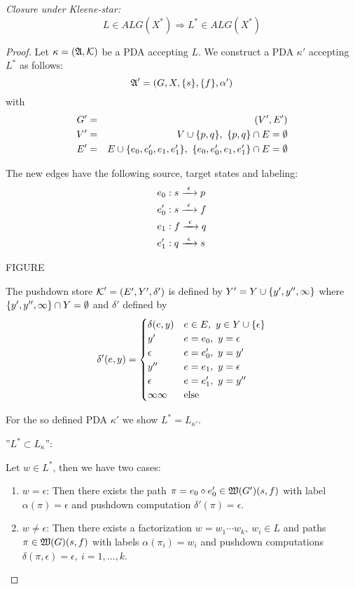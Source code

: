 {\em Closure under Kleene-star:}
\[ L \in ALG(X^*) \Rightarrow L^* \in ALG(X^*) \]
\begin{proof}
Let $\kappa = (\mbox{$\mathfrak{A}$}, \mbox{$\mathcal{K}$})$ be a PDA accepting $L$. We construct a PDA
$\kappa'$ accepting $L^*$ as follows:
\[ \mbox{$\mathfrak{A}$}' = (G, X, \mbox{$\{s\}$}, \mbox{$\{f\}$}, \alpha')\]
with
\begin{eqnarray*}
G' &=& (V', E') \\
V' &=& V \cup \mbox{$\{p, q\}$},\ \mbox{$\{p, q\}$} \cap E = \emptyset \\
E' &=& E \cup \mbox{$\{e_0, e_0', e_1, e_1'\}$},\ \mbox{$\{e_0, e_0', e_1, e_1'\}$} \cap E
= \emptyset \\
\end{eqnarray*}

The new edges have the following source, target states and labeling:
\begin{eqnarray*}
& e_0: s \xrightarrow{\ {\epsilon}\ } p \\
& e_0': s \xrightarrow{\ {\epsilon}\ } f \\
& e_1: f \xrightarrow{\ {\epsilon}\ } q \\
& e_1': q \xrightarrow{\ {\epsilon}\ } s \\
\end{eqnarray*}

FIGURE

The pushdown store $\mbox{$\mathcal{K}$}' = (E', Y', \delta')$ is defined by $Y' = Y
\cup \mbox{$\{y', y'', \infty\}$}$ where $\mbox{$\{y', y'', \infty\}$} \cap Y =
\emptyset$ and $\delta'$ defined by
\[ \delta'(e, y) = \begin{cases}
\delta(e, y)		& e \in E,\ y \in  Y \cup \mbox{$\{\epsilon\}$} \\
y'							& e = e_0,\ y = \epsilon \\
\epsilon				& e = e_0',\ y = y' \\
y''							& e = e_1,\ y = \epsilon \\
\epsilon				& e = e_1',\ y = y'' \\
\infty\infty		& \text{else}
\end{cases}\]

For the so defined PDA $\kappa'$ we show $L^* = L_{\kappa'}$.

''$L^* \subset L_{\kappa}$'':

Let $w \in L^*$, then we have two cases:

\begin{enumerate}
  \item $w = \epsilon$: Then there exists the path $\pi = e_0 \circ e_0' \in
  \mbox{$\mathfrak{W}(G')$}(s, f)$ with label $\alpha(\pi) = \epsilon$ and
  pushdown computation $\delta'(\pi) = \epsilon$.
  \item $w \neq \epsilon$: Then there exists a factorization $w = w_1 \cdots
  w_k,\ w_i \in L$ and paths $\pi \in \mbox{$\mathfrak{W}(G)$}(s, f)$ with labels
  $\alpha(\pi_i) = w_i$ and pushdown computations $\delta(\pi, \epsilon) =
  \epsilon,\ i = 1, \ldots, k$.
  

\end{enumerate}
\end{proof}
